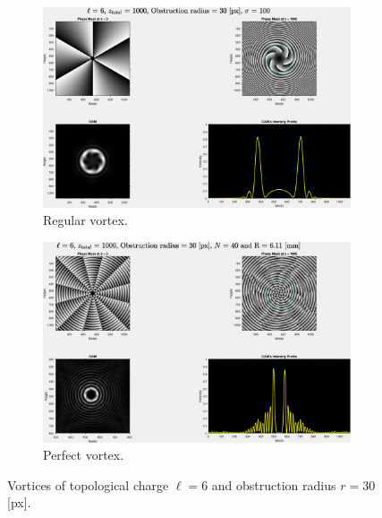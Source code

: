 \begin{figure}[htbp]
    \centering
    \begin{subfigure}[b]{0.45\textwidth}
        \centering
        \includegraphics[width=\textwidth]{images/Appendices/Additional_Results/Topological_Charge/type=0_r=30_zi=0_zf=1000.eps}
        \caption{Regular vortex.}
    \end{subfigure}
    \hfill
    \begin{subfigure}[b]{0.45\textwidth}
        \centering
        \includegraphics[width=\textwidth]{images/Appendices/Additional_Results/Topological_Charge/type=1_r=30_zi=0_zf=1000.eps}
        \caption{Perfect vortex.}
    \end{subfigure}
    \caption{Vortices of topological charge $\ell = 6$ and obstruction radius $r = 30$ [px].}
    \label{fig:L=6_r=30}
\end{figure}

